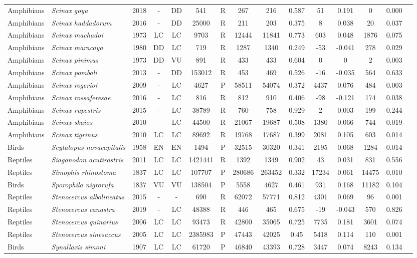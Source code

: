 \documentclass[12pt,openright,oneside,a4paper,english]{abntex2}
\begin{document}
\begin{landscape}
\begin{longtable}{llccccccccccccc}
		Amphibians&\textit{Scinax goya}&2018&-&DD&541&R&267&216&0.587&51&0.191&0&0.000\\
		Amphibians&\textit{Scinax haddadorum}&2016&-&DD&25000&R&211&203&0.375&8&0.038&20&0.037\\
		Amphibians&\textit{Scinax machadoi}&1973&LC&LC&9703&R&12444&11841&0.773&603&0.048&1876&0.075\\
		Amphibians&\textit{Scinax maracaya}&1980&DD&LC&719&R&1287&1340&0.249&-53&-0.041&278&0.029\\
		Amphibians&\textit{Scinax pinimus}&1973&DD&VU&891&R&433&433&0.604&0&0&2&0.003\\
		Amphibians&\textit{Scinax pombali}&2013&-&DD&153012&R&453&469&0.526&-16&-0.035&564&0.633\\
		Amphibians&\textit{Scinax rogerioi}&2009&-&LC&4627&P&58511&54074&0.372&4437&0.076&484&0.003\\
		Amphibians&\textit{Scinax rossaferesae}&2016&-&LC&816&R&812&910&0.406&-98&-0.121&174&0.038\\
		Amphibians&\textit{Scinax rupestris}&2015&-&LC&38789&R&760&758&0.929&2&0.003&199&0.244\\
		Amphibians&\textit{Scinax skaios}&2010&-&LC&44500&R&21067&19687&0.508&1380&0.066&744&0.019\\
		Amphibians&\textit{Scinax tigrinus}&2010&LC&LC&89692&R&19768&17687&0.399&2081&0.105&603&0.014\\
		Birds&\textit{Scytalopus novacapitalis}&1958&EN&EN&1494&P&32515&30320&0.341&2195&0.068&1284&0.014\\
		Reptiles&\textit{Siagonodon acutirostris}&2011&LC&LC&1421441&R&1392&1349&0.902&43&0.031&831&0.556\\
		Reptiles&\textit{Simophis rhinostoma}&1837&LC&LC&107707&P&280686&263452&0.332&17234&0.061&14475&0.010\\
		Birds&\textit{Sporophila nigrorufa}&1837&VU&VU&138504&P&5558&4627&0.461&931&0.168&11182&0.104\\
		Reptiles&\textit{Stenocercus albolineatus}&2015&-&-&690&R&62072&57771&0.812&4301&0.069&96&0.001\\
		Reptiles&\textit{Stenocercus canastra}&2019&-&LC&48388&R&446&465&0.675&-19&-0.043&570&0.826\\
		Reptiles&\textit{Stenocercus quinarius}&2006&LC&LC&93473&R&42800&35065&0.725&7735&0.181&3601&0.074\\
		Reptiles&\textit{Stenocercus sinesaccus}&2005&LC&LC&2385983&P&47443&42025&0.45&5418&0.114&110&0.001\\
		Birds&\textit{Synallaxis simoni}&1907&LC&LC&61720&P&46840&43393&0.728&3447&0.074&8243&0.134\\

\end{longtable}
\end{landscape}
\end{document}
